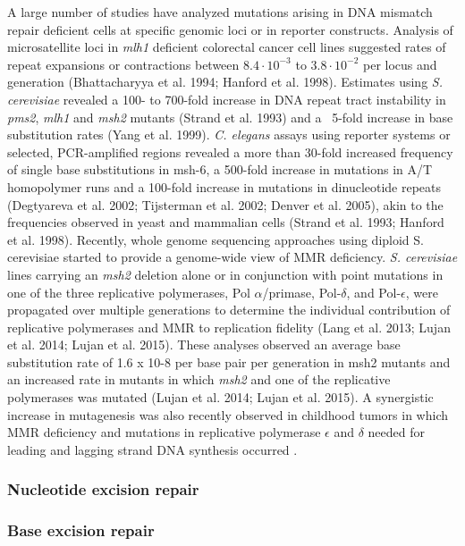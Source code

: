 A large number of studies have analyzed mutations arising in DNA mismatch repair deficient cells at specific 
genomic loci or in reporter constructs. Analysis of microsatellite loci in \textit{mlh1} deficient 
colorectal cancer cell lines suggested rates of repeat expansions or contractions between 
$8.4 \cdot 10^{-3}$ to $3.8 \cdot 10^{-2}$ per locus and generation 
(Bhattacharyya et al. 1994; Hanford et al. 1998). Estimates using \textit{S. cerevisiae} 
revealed a 100- to 700-fold increase in DNA repeat tract instability in \textit{pms2}, 
\textit{mlh1} and \textit{msh2} mutants (Strand et al. 1993) and a ~5-fold increase in 
base substitution rates (Yang et al. 1999). \textit{C. elegans} assays using reporter 
systems or selected, PCR-amplified regions revealed a more than 30-fold increased 
frequency of single base substitutions in msh-6, a 500-fold increase in mutations 
in A/T homopolymer runs and a 100-fold increase in mutations in dinucleotide repeats 
(Degtyareva et al. 2002; Tijsterman et al. 2002; Denver et al. 2005), akin to the 
frequencies observed in yeast and mammalian cells (Strand et al. 1993; Hanford et al. 1998). 
Recently, whole genome sequencing approaches using diploid S. cerevisiae started to provide 
a genome-wide view of MMR deficiency. \textit{S. cerevisiae} lines carrying an \textit{msh2} 
deletion alone or in conjunction with point mutations in one of the three replicative 
polymerases, Pol $\alpha$/primase, Pol-$\delta$, and Pol-$\epsilon$, were propagated over 
multiple generations to determine the individual contribution of replicative polymerases 
and MMR to replication fidelity (Lang et al. 2013; Lujan et al. 2014; Lujan et al. 2015). 
These analyses observed an average base substitution rate of 1.6 x 10-8 per base pair per 
generation in msh2 mutants and an increased rate in mutants in which \textit{msh2} and one 
of the replicative polymerases was mutated (Lujan et al. 2014; Lujan et al. 2015). 
A synergistic increase in mutagenesis was also recently observed in childhood tumors in 
which MMR deficiency and mutations in replicative polymerase $\epsilon$ and $\delta$ 
needed for leading and lagging strand DNA synthesis occurred \cite{Shlien}. 

\subsubsection*{Nucleotide excision repair}

\subsubsection*{Base excision repair}

